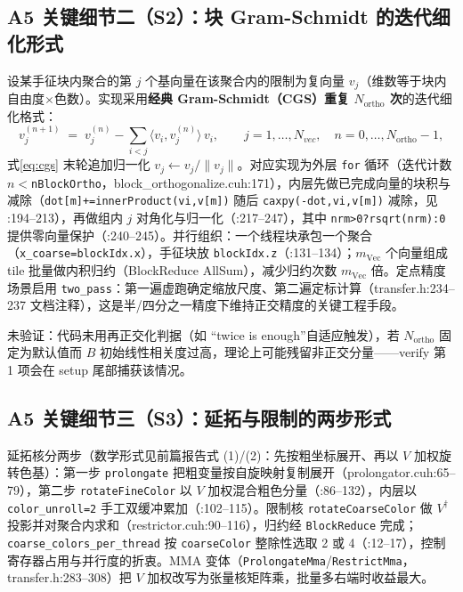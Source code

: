 \documentclass[UTF8]{ctexart}
\begin{document}
\subsection{A5 关键细节二（S2）：块 Gram-Schmidt 的迭代细化形式}

设某手征块内聚合的第 $j$ 个基向量在该聚合内的限制为复向量 $v_j$（维数等于块内自由度$\times$色数）。实现采用\textbf{经典 Gram-Schmidt（CGS）重复 $N_{\text{ortho}}$ 次}的迭代细化格式：
\begin{equation}
v_j^{(n+1)} \;=\; v_j^{(n)}-\sum_{i<j}\langle v_i,v_j^{(n)}\rangle\,v_i,\qquad j=1,\dots,N_{vec},\quad n=0,\dots,N_{\text{ortho}}-1,
\label{eq:cgs}
\end{equation}
式\eqref{eq:cgs} 末轮追加归一化 $v_j\leftarrow v_j/\|v_j\|$。对应实现为外层 \texttt{for} 循环（迭代计数 $n<$\texttt{nBlockOrtho}，block\_orthogonalize.cuh:171），内层先做已完成向量的块积与减除（\texttt{dot[m]+=innerProduct(vi,v[m])} 随后 \texttt{caxpy(-dot,vi,v[m])} 减除，见 :194--213），再做组内 $j$ 对角化与归一化（:217--247），其中 \texttt{nrm>0?rsqrt(nrm):0} 提供零向量保护（:240--245）。并行组织：一个线程块承包一个聚合（\texttt{x\_coarse=blockIdx.x}），手征块放 \texttt{blockIdx.z}（:131--134）；$m_{\text{Vec}}$ 个向量组成 tile 批量做内积归约（BlockReduce AllSum），减少归约次数 $m_{\text{Vec}}$ 倍。定点精度场景启用 \texttt{two\_pass}：第一遍虚跑确定缩放尺度、第二遍定标计算（transfer.h:234--237 文档注释），这是半/四分之一精度下维持正交精度的关键工程手段。

\textcolor{warn}{未验证}：代码未用再正交化判据（如 ``twice is enough''自适应触发），若 $N_{\text{ortho}}$ 固定为默认值而 $B$ 初始线性相关度过高，理论上可能残留非正交分量——verify 第 1 项会在 setup 尾部捕获该情况。


\subsection{A5 关键细节三（S3）：延拓与限制的两步形式}

延拓核分两步（数学形式见前篇报告式 (1)/(2)：先按粗坐标展开、再以 $V$ 加权旋转色基）：第一步 \texttt{prolongate} 把粗变量按自旋映射复制展开（prolongator.cuh:65--79），第二步 \texttt{rotateFineColor} 以 $V$ 加权混合粗色分量（:86--132），内层以 \texttt{color\_unroll=2} 手工双缓冲累加（:102--115）。限制核 \texttt{rotateCoarseColor} 做 $V^\dagger$ 投影并对聚合内求和（restrictor.cuh:90--116），归约经 \texttt{BlockReduce} 完成；\texttt{coarse\_colors\_per\_thread} 按 \texttt{coarseColor} 整除性选取 2 或 4（:12--17），控制寄存器占用与并行度的折衷。MMA 变体（\texttt{ProlongateMma}/\texttt{RestrictMma}，transfer.h:283--308）把 $V$ 加权改写为张量核矩阵乘，批量多右端时收益最大。
\end{document}
